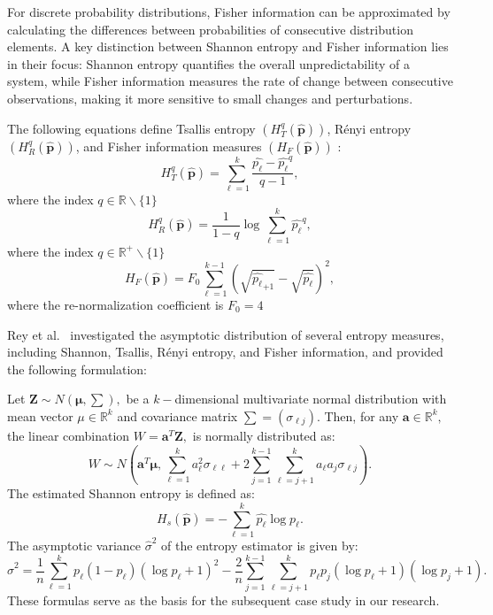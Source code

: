 For discrete probability distributions, Fisher information can be approximated by calculating the differences between probabilities of consecutive distribution elements. A key distinction between Shannon entropy and Fisher information lies in their focus: Shannon entropy quantifies the overall unpredictability of a system, while Fisher information measures the rate of change between consecutive observations, making it more sensitive to small changes and perturbations.

The following equations define Tsallis entropy $	(H_{T}^{q}(\widehat{\mathbf{p}}))$, Rényi entropy $(H_{R}^{q}(\widehat{\mathbf{p}}))$, and Fisher information measures $(H_{F}(\widehat{\mathbf{p}}))$ \cite{sanchez2009discrete} :
\begin{equation}
	H_{T}^{q}(\widehat{\mathbf{p}})=\sum_{\ell=1}^{k}\dfrac{\widehat{p_\ell}-\widehat{p_\ell}^q}{q-1},
\end{equation}
where the index $q\in \mathbb{R}\backslash \{1\}$
\begin{equation}
	H_{R}^{q}(\widehat{\mathbf{p}})=\dfrac{1}{1-q} \log \sum_{\ell=1}^{k}{\widehat{p_\ell}}^q,
\end{equation}
where the index $q\in \mathbb{R}^{+}\backslash \{1\}$
\begin{equation}
	H_F(\widehat{\mathbf{p}})=F_0\sum_{\ell=1}^{k-1}(\sqrt{\widehat{p_\ell}_{+1}}-\sqrt{\widehat{p_\ell}})^2 ,
\end{equation}
where the re-normalization coefficient is $F_0=4$ \cite{sanchez2009discrete}

Rey et al.~\cite{Rey2023} investigated the asymptotic distribution of several entropy measures, including Shannon, Tsallis, Rényi entropy, and Fisher information, and provided the following formulation:

Let  $\mathbf{Z}\sim N(\mathbf{\mu},\sum),$ be a $k-$dimensional multivariate normal distribution with mean vector $\mu \in \mathbb{R}^k$ and covariance matrix $\sum=(\sigma_{{\ell}{j}})$. Then, for any $\mathbf{a} \in \mathbb{R}^k,$ the linear combination $W=\mathbf{a}^T\mathbf{Z},$ is normally distributed as:
\begin{equation}
	W\sim N(\mathbf{a}^T\bm{\mu},\sum_{\ell=1}^{k}a_\ell^2 \sigma_{{\ell}{\ell}}+2\sum_{j=1}^{k-1}\sum_{\ell=j+1}^{k} a_\ell a_j\sigma_{{\ell}{j}}).
\end{equation}
The estimated Shannon entropy is defined as:
\begin{equation}
	H_s(\widehat{\mathbf{p}})=-\sum_{\ell=1}^{k}\widehat{p_\ell}\log\widehat{p_\ell}.
\end{equation}
The asymptotic variance $\widehat{\sigma}^2$ of the entropy estimator is given by:
\begin{equation}
	\widehat{\sigma}^2=\dfrac{1}{n}\sum_{\ell=1}^{k}p_\ell(1-p_\ell)(\log p_\ell+1)^2-\dfrac{2}{n}\sum_{j=1}^{k-1}\sum_{\ell=j+1}^{k}p_\ell p_j(\log p_\ell+1)(\log p_j+1).
\end{equation}
These formulas serve as the basis for the subsequent case study in our research.

